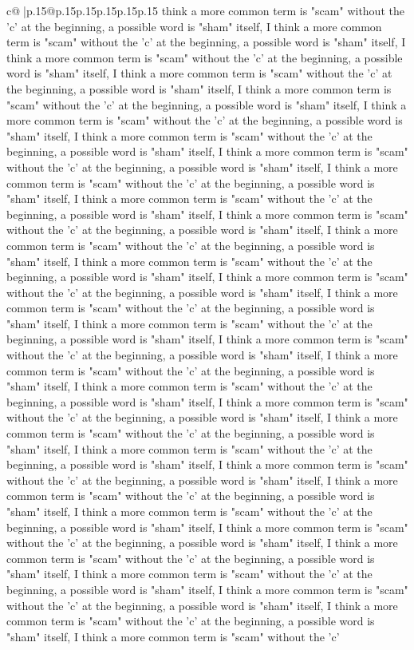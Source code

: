 \documentclass{article}
\begin{document}
{\begin{supertabular}{c@{$\;$}|p{.15\linewidth}@{}p{.15\linewidth}p{.15\linewidth}p{.15\linewidth}p{.15\linewidth}p{.15\linewidth}}
{{{think a more common term is "scam" without the 'c' at the beginning, a possible word is "sham" itself, I think a more common term is "scam" without the 'c' at the beginning, a possible word is "sham" itself, I think a more common term is "scam" without the 'c' at the beginning, a possible word is "sham" itself, I think a more common term is "scam" without the 'c' at the beginning, a possible word is "sham" itself, I think a more common term is "scam" without the 'c' at the beginning, a possible word is "sham" itself, I think a more common term is "scam" without the 'c' at the beginning, a possible word is "sham" itself, I think a more common term is "scam" without the 'c' at the beginning, a possible word is "sham" itself, I think a more common term is "scam" without the 'c' at the beginning, a possible word is "sham" itself, I think a more common term is "scam" without the 'c' at the beginning, a possible word is "sham" itself, I think a more common term is "scam" without the 'c' at the beginning, a possible word is "sham" itself, I think a more common term is "scam" without the 'c' at the beginning, a possible word is "sham" itself, I think a more common term is "scam" without the 'c' at the beginning, a possible word is "sham" itself, I think a more common term is "scam" without the 'c' at the beginning, a possible word is "sham" itself, I think a more common term is "scam" without the 'c' at the beginning, a possible word is "sham" itself, I think a more common term is "scam" without the 'c' at the beginning, a possible word is "sham" itself, I think a more common term is "scam" without the 'c' at the beginning, a possible word is "sham" itself, I think a more common term is "scam" without the 'c' at the beginning, a possible word is "sham" itself, I think a more common term is "scam" without the 'c' at the beginning, a possible word is "sham" itself, I think a more common term is "scam" without the 'c' at the beginning, a possible word is "sham" itself, I think a more common term is "scam" without the 'c' at the beginning, a possible word is "sham" itself, I think a more common term is "scam" without the 'c' at the beginning, a possible word is "sham" itself, I think a more common term is "scam" without the 'c' at the beginning, a possible word is "sham" itself, I think a more common term is "scam" without the 'c' at the beginning, a possible word is "sham" itself, I think a more common term is "scam" without the 'c' at the beginning, a possible word is "sham" itself, I think a more common term is "scam" without the 'c' at the beginning, a possible word is "sham" itself, I think a more common term is "scam" without the 'c' at the beginning, a possible word is "sham" itself, I think a more common term is "scam" without the 'c' at the beginning, a possible word is "sham" itself, I think a more common term is "scam" without the 'c' at the beginning, a possible word is "sham" itself, I think a more common term is "scam" without the 'c' at the beginning, a possible word is "sham" itself, I think a more common term is "scam" without the 'c' at the beginning, a possible word is "sham" itself, I think a more common term is "scam" without the 'c' }}}
\end{supertabular}}
\end{document}

